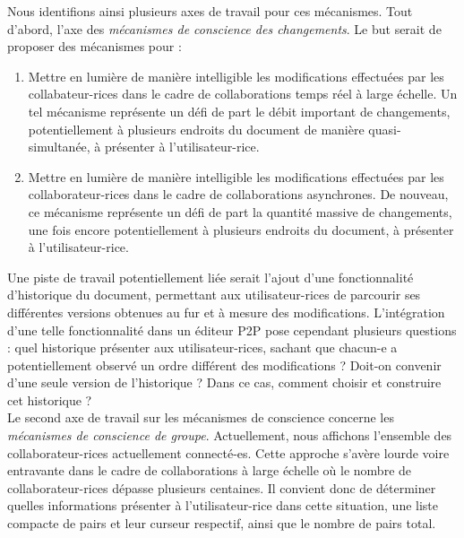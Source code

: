 Nous identifions ainsi plusieurs axes de travail pour ces mécanismes.
Tout d'abord, l'axe des \emph{mécanismes de conscience des changements}.
Le but serait de proposer des mécanismes pour :
\begin{enumerate}
    \item Mettre en lumière de manière intelligible les modifications effectuées par les collabateur-rices dans le cadre de collaborations temps réel à large échelle.
        Un tel mécanisme représente un défi de part le débit important de changements, potentiellement à plusieurs endroits du document de manière quasi-simultanée, à présenter à l'utilisateur-rice.
    \item Mettre en lumière de manière intelligible les modifications effectuées par les collaborateur-rices dans le cadre de collaborations asynchrones.
        De nouveau, ce mécanisme représente un défi de part la quantité massive de changements, une fois encore potentiellement à plusieurs endroits du document, à présenter à l'utilisateur-rice.
\end{enumerate}
Une piste de travail potentiellement liée serait l'ajout d'une fonctionnalité d'historique du document, permettant aux utilisateur-rices de parcourir ses différentes versions obtenues au fur et à mesure des modifications.
L'intégration d'une telle fonctionnalité dans un éditeur \ac{P2P} pose cependant plusieurs questions : quel historique présenter aux utilisateur-rices, sachant que chacun-e a potentiellement observé un ordre différent des modifications ?
Doit-on convenir d'une seule version de l'historique ?
Dans ce cas, comment choisir et construire cet historique ?\\

Le second axe de travail sur les mécanismes de conscience concerne les \emph{mécanismes de conscience de groupe}.
Actuellement, nous affichons l'ensemble des collaborateur-rices actuellement connecté-es.
Cette approche s'avère lourde voire entravante dans le cadre de collaborations à large échelle où le nombre de collaborateur-rices dépasse plusieurs centaines.
Il convient donc de déterminer quelles informations présenter à l'utilisateur-rice dans cette situation, \eg une liste compacte de pairs et leur curseur respectif, ainsi que le nombre de pairs total.

